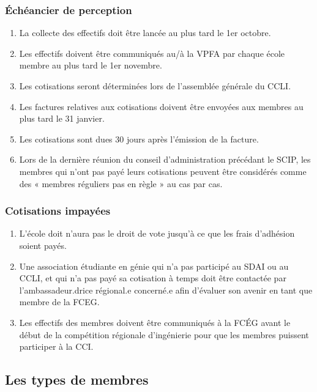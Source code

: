\subsubsection{Échéancier de perception}
\label{echeancier-de-perception}
\begin{enumerate}
 \item La collecte des effectifs doit être lancée au plus tard le 1er octobre.
 \item Les effectifs doivent être communiqués au/à la VPFA par chaque école membre au plus tard le 1er novembre.
 \item Les cotisations seront déterminées lors de l'assemblée générale du CCLI.
 \item Les factures relatives aux cotisations doivent être envoyées aux membres au plus tard le 31 janvier.
 \item Les cotisations sont dues 30 jours après l'émission de la facture.
 \item Lors de la dernière réunion du conseil d'administration précédant le SCIP, les membres qui n'ont pas payé leurs cotisations peuvent être considérés comme des « membres réguliers pas en règle » au cas par cas.

\end{enumerate}

\subsubsection{Cotisations impayées}
\label{cotisations-impayees}
\begin{enumerate}
 \item L'école doit n'aura pas le droit de vote jusqu'à ce que les frais d'adhésion soient payés.
 \item Une association étudiante en génie qui n'a pas participé au SDAI ou au CCLI, et qui n'a pas payé sa cotisation à temps doit être contactée par l'ambassadeur.drice régional.e concerné.e afin d'évaluer son avenir en tant que membre de la FCEG.
 \item Les effectifs des membres doivent être communiqués à la FCÉG avant le début de la compétition régionale d'ingénierie pour que les membres puissent participer à la CCI.
\end{enumerate}

\subsection{Les types de membres}
\label{les-types-de-membres}

